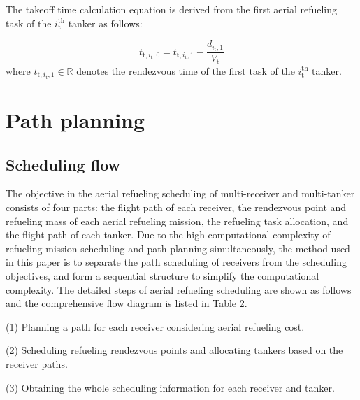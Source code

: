 The takeoff time calculation equation is derived from the first aerial refueling task of the $i_{\text{t}}^{\text{th}}$  tanker as follows:

\begin{equation}
t_{\text{t},i_\text{t},0}=t_{\text{t},i_\text{t},1}-\frac{d_{i_\text{t},1}}{V_\text{t}}
\label{eq:15.30}
\end{equation}
where $t_{\text{t},i_\text{t},1}\in\mathbb{R}$  denotes the rendezvous time of the first task of the $i_{\text{t}}^{\text{th}}$  tanker.








\section{Path planning}\label{sec_3}
\subsection{Scheduling flow}

The objective in the aerial refueling scheduling of multi-receiver and multi-tanker consists of four parts: the flight path of each receiver, the rendezvous point and refueling mass of each aerial refueling mission, the refueling task allocation, and the flight path of each tanker. Due to the high computational complexity of refueling mission scheduling and path planning simultaneously, the method used in this paper is to separate the path scheduling of receivers from the scheduling objectives, and form a sequential structure to simplify the computational complexity. The detailed steps of aerial refueling scheduling are shown as follows and the comprehensive flow diagram is listed in Table 2.

(1) Planning a path for each receiver considering aerial refueling cost.

(2) Scheduling refueling rendezvous points and allocating tankers based on the receiver paths.

(3) Obtaining the whole scheduling information for each receiver and tanker.



